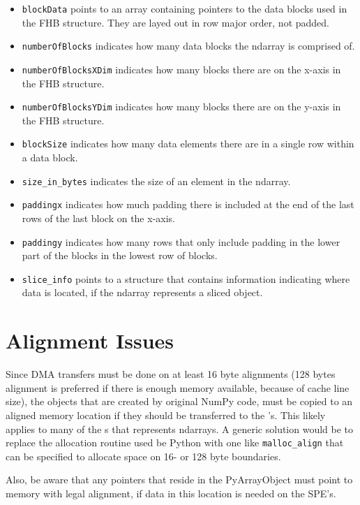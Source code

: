 \begin{itemize}
\item{\texttt{blockData} points to an array containing pointers to the data blocks used in the FHB structure. They are layed out in row major order, not padded.}
\item{\texttt{numberOfBlocks} indicates how many data blocks the ndarray is comprised of.}
\item{\texttt{numberOfBlocksXDim} indicates how many blocks there are on the x-axis in the FHB structure.}
\item{\texttt{numberOfBlocksYDim} indicates how many blocks there are on the y-axis in the FHB structure.}
\item{\texttt{blockSize} indicates how many data elements there are in a single row within a data block.}
\item{\texttt{size\_in\_bytes} indicates the size of an element in the ndarray.}
\item{\texttt{paddingx} indicates how much padding there is included at the end of the last rows of the last block on the x-axis.}
\item{\texttt{paddingy} indicates how many rows that only include padding in the lower part of the blocks in the lowest row of blocks.}
\item{\texttt{slice\_info} points to a structure that contains information indicating where data is located, if the ndarray represents a sliced object.}
\end{itemize}



\section{Alignment Issues}
Since DMA transfers must be done on at least 16 byte alignments (128
bytes alignment is preferred if there is enough memory available,
because of cache line size), the objects that are created by original
NumPy code, must be copied to an aligned memory location if they
should be transferred to the \SPE{}'s. This likely applies to many of
the s that represents ndarrays. A generic solution
would be to replace the allocation routine used be Python with one
like \texttt{malloc\_align} that can be specified to allocate space on
16- or 128 byte boundaries.

Also, be aware that any pointers that reside in the PyArrayObject must point to memory with legal alignment,
if data in this location is needed on the SPE's.

